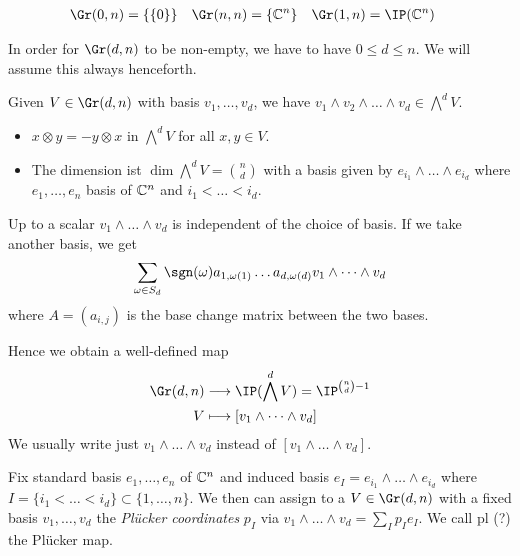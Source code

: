 \documentclass{skript}
\begin{document}
\begin{bsp}
    \begin{align*}
        \Gr(0,n) &= \{\{0\}\}   &&     \Gr(n,n) = \{\IC^n\} &&       \Gr(1,n) = \IP(\IC^n)
    \end{align*}
\end{bsp}

\begin{note}
    In order for $\Gr(d,n)$ to be non-empty, we have to have $0\leq d\leq n$. 
    We will assume this always henceforth.
\end{note}

Given $V\in \Gr(d,n)$ with basis $v_1,\dots, v_d$, we have $v_1\wedge v_2\wedge \dots \wedge v_d \in \bigwedge^d V$.

\begin{fact}
    \begin{itemize}
        \item
            $x\otimes y = - y\otimes x$ in $\bigwedge^d V$ for all $x,y\in V$.
        \item
            The dimension ist $\dim \bigwedge^d V = \binom nd$ with a basis given by $e_{i_1}\wedge \dots \wedge e_{i_d}$ where $e_1,\dots, e_n$ basis of $\mathbb{C}^n$ and $i_1<\dots < i_d$.
    \end{itemize}
\end{fact}
    
\begin{note}
    Up to a scalar $v_1\wedge\dots\wedge v_d$ is independent of the choice of basis.
    If we take another basis, we get 
    \begin{align*}
        \sum_{\omega\in S_d} \sgn(\omega) a_{1,\omega(1)} \dots a_{d,\omega(d)} v_1\wedge\dots \wedge v_d
    \end{align*}
    where $A = (a_{i,j})$ is the base change matrix between the two bases.

    Hence we obtain a well-defined map 
    \begin{align*}
        \Gr(d,n) &\longrightarrow \IP(\bigwedge^d V) = \IP^{\binom nd-1}\\
        V &\longmapsto [v_1\wedge\dots \wedge v_d]
    \end{align*}
    We usually write just $v_1\wedge \dots \wedge v_d$ instead of $[v_1\wedge\dots \wedge v_d]$.
\end{note}

\begin{definition}\label{def:plcoor}
    Fix standard basis $e_1,\dots, e_n$ of $\mathbb{C}^n$ and induced basis $e_I = e_{i_1}\wedge \dots\wedge e_{i_d}$ where $I=\{i_1< \dots < i_d\} \subset \{1, \dots, n\}$.
    We then can assign to a $V\in \Gr(d,n)$ with a fixed basis $v_1,\dots, v_d$ the \emph{Plücker coordinates} $p_I$ via $v_1\wedge \dots \wedge v_d = \sum_{I} p_I e_I$.
    We call pl (?) the Plücker map.
\end{definition}
\end{document}
